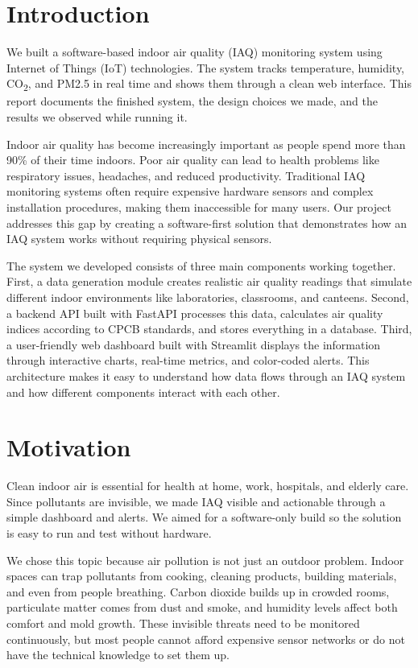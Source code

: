 \documentclass[12pt]{report}
\begin{document}
\section{Introduction}
We built a software-based indoor air quality (IAQ) monitoring system using Internet of Things (IoT) technologies. The system tracks temperature, humidity, CO\textsubscript{2}, and PM2.5 in real time and shows them through a clean web interface. This report documents the finished system, the design choices we made, and the results we observed while running it.

Indoor air quality has become increasingly important as people spend more than 90\% of their time indoors. Poor air quality can lead to health problems like respiratory issues, headaches, and reduced productivity. Traditional IAQ monitoring systems often require expensive hardware sensors and complex installation procedures, making them inaccessible for many users. Our project addresses this gap by creating a software-first solution that demonstrates how an IAQ system works without requiring physical sensors.

The system we developed consists of three main components working together. First, a data generation module creates realistic air quality readings that simulate different indoor environments like laboratories, classrooms, and canteens. Second, a backend API built with FastAPI processes this data, calculates air quality indices according to CPCB standards, and stores everything in a database. Third, a user-friendly web dashboard built with Streamlit displays the information through interactive charts, real-time metrics, and color-coded alerts. This architecture makes it easy to understand how data flows through an IAQ system and how different components interact with each other.

\section{Motivation}
Clean indoor air is essential for health at home, work, hospitals, and elderly care. Since pollutants are invisible, we made IAQ visible and actionable through a simple dashboard and alerts. We aimed for a software-only build so the solution is easy to run and test without hardware.

We chose this topic because air pollution is not just an outdoor problem. Indoor spaces can trap pollutants from cooking, cleaning products, building materials, and even from people breathing. Carbon dioxide builds up in crowded rooms, particulate matter comes from dust and smoke, and humidity levels affect both comfort and mold growth. These invisible threats need to be monitored continuously, but most people cannot afford expensive sensor networks or do not have the technical knowledge to set them up.
\end{document}
